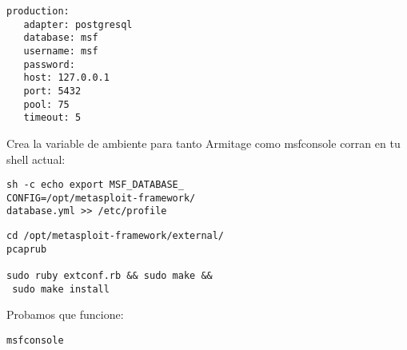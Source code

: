 \documentclass[12pt,twocolumn]{report}
\begin{document}
\begin{lstlisting}
production:
   adapter: postgresql
   database: msf
   username: msf
   password: 
   host: 127.0.0.1
   port: 5432
   pool: 75
   timeout: 5
\end{lstlisting}

Crea la variable de ambiente para tanto Armitage como msfconsole corran en tu shell actual:
\begin{lstlisting}
sh -c echo export MSF_DATABASE_
CONFIG=/opt/metasploit-framework/
database.yml >> /etc/profile
\end{lstlisting}

\begin{lstlisting}
cd /opt/metasploit-framework/external/
pcaprub

sudo ruby extconf.rb && sudo make &&
 sudo make install
\end{lstlisting}

Probamos que funcione:
\begin{lstlisting}
msfconsole
\end{lstlisting}



\end{document}
